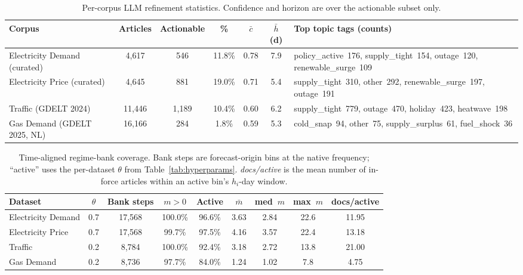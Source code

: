 \documentclass{article}
\begin{document}
\begin{table}[h]
    \centering
    \caption{Per-corpus LLM refinement statistics. Confidence and horizon are over the actionable subset only.}
    \label{tab:news_corpus_stats}
    \scriptsize
    \setlength{\tabcolsep}{5pt}
    \renewcommand{\arraystretch}{1.05}
    \begin{tabular}{lcccccp{}}
        \toprule
        \textbf{Corpus} & \textbf{Articles} & \textbf{Actionable} & \textbf{\%} & \textbf{$\bar{c}$} & \textbf{$\bar h$ (d)} & \textbf{Top topic tags (counts)} \\
        \midrule
        Electricity Demand (curated) & 4{,}617 & 546 & 11.8\% & 0.78 & 7.9 & policy\_active~176, supply\_tight~154, outage~120, renewable\_surge~109 \\
        Electricity Price (curated)  & 4{,}645 & 881 & 19.0\% & 0.71 & 5.4 & supply\_tight~310, other~292, renewable\_surge~197, outage~191 \\
        Traffic (GDELT 2024)         & 11{,}446 & 1{,}189 & 10.4\% & 0.60 & 6.2 & supply\_tight~779, outage~470, holiday~423, heatwave~198 \\
        Gas Demand (GDELT 2025, NL)  & 16{,}166 & 284 & 1.8\% & 0.59 & 5.3 & cold\_snap~94, other~75, supply\_surplus~61, fuel\_shock~36 \\
        \bottomrule
    \end{tabular}
\end{table}

\begin{table}[h]
    \centering
    \caption{Time-aligned regime-bank coverage. Bank steps are forecast-origin bins at the native frequency; ``active'' uses the per-dataset $\theta$ from Table~\ref{tab:hyperparams}. \emph{docs/active} is the mean number of in-force articles within an active bin's $h_i$-day window.}
    \label{tab:bank_coverage}
    \scriptsize
    \setlength{\tabcolsep}{5pt}
    \renewcommand{\arraystretch}{1.05}
    \begin{tabular}{lcccccccc}
        \toprule
        \textbf{Dataset} & \textbf{$\theta$} & \textbf{Bank steps} & \textbf{$m\!>\!0$} & \textbf{Active} & \textbf{$\bar m$} & \textbf{med~$m$} & \textbf{max~$m$} & \textbf{docs/active} \\
        \midrule
        Electricity Demand & 0.7 & 17{,}568 & 100.0\% & 96.6\% & 3.63 & 2.84 & 22.6 & 11.95 \\
        Electricity Price  & 0.7 & 17{,}568 &  99.7\% & 97.5\% & 4.16 & 3.57 & 22.4 & 13.18 \\
        Traffic            & 0.2 &  8{,}784 & 100.0\% & 92.4\% & 3.18 & 2.72 & 13.8 & 21.00 \\
        Gas Demand         & 0.2 &  8{,}736 &  97.7\% & 84.0\% & 1.24 & 1.02 &  7.8 &  4.75 \\
        \bottomrule
    \end{tabular}
\end{table}
\end{document}
